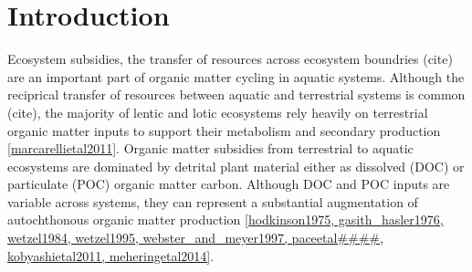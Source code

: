\section{Introduction}
Ecosystem subsidies, the transfer of resources across ecosystem boundries (cite) are an important part of organic matter cycling in aquatic systems. Although the reciprical transfer of resources between aquatic and terrestrial systems is common (cite), the majority of lentic and lotic ecosystems rely heavily on terrestrial organic matter inputs to support their metabolism and secondary production \ref{marcarellietal2011}. Organic matter subsidies from terrestrial to aquatic ecosystems are dominated by detrital plant material either as dissolved (DOC) or particulate (POC) organic matter carbon. Although DOC and POC inputs are variable across systems, they can represent a substantial augmentation of autochthonous organic matter production \ref{hodkinson1975, gasith_hasler1976, wetzel1984, wetzel1995, webster_and_meyer1997, paceetal####, kobyashietal2011, meheringetal2014}.    



